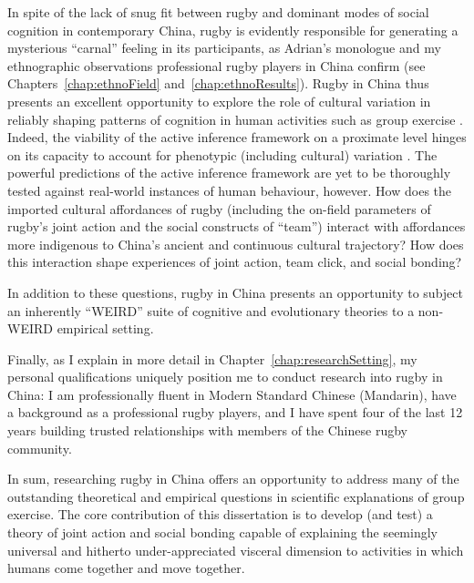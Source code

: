 \begin{CJK}{UTF8}{gbsn}
In spite of the lack of snug fit between rugby and dominant modes of social cognition in contemporary China, rugby is evidently responsible for generating a mysterious ``carnal'' feeling in its participants, as Adrian's monologue and my ethnographic observations professional rugby players in China confirm (see Chapters~\ref{chap:ethnoField} and~\ref{chap:ethnoResults}).  Rugby in China thus presents an excellent opportunity to explore the role of cultural variation in reliably shaping patterns of cognition in human activities such as group exercise \citep{Ramstead2016,Mesoudi2013}.  Indeed, the viability of the active inference framework on a proximate level hinges on its capacity to account for phenotypic (including cultural) variation \citep{Badcock2012}.  The powerful predictions of the active inference framework are yet to be thoroughly tested against real-world instances of human behaviour, however.  How does the imported cultural affordances of rugby (including the on-field parameters of rugby's joint action and the social constructs of ``team'') interact with affordances more indigenous to China's ancient and continuous cultural trajectory?  How does this interaction shape experiences of joint action, team click, and social bonding?

In addition to these questions, rugby in China presents an opportunity to subject an inherently ``WEIRD'' \citep[Western, Educated, Industrial, Rich, and Democratic; see][]{Henrich2010d} suite of cognitive and evolutionary theories to a non-WEIRD empirical setting.

Finally, as I explain in more detail in Chapter~\ref{chap:researchSetting}, my personal qualifications uniquely position me to conduct research into rugby in China: I am professionally fluent in Modern Standard Chinese (Mandarin), have a background as a professional rugby players, and I have spent four of the last 12 years building trusted relationships with members of the Chinese rugby community.


In sum, researching rugby in China offers an opportunity to address many of the outstanding theoretical and empirical questions in scientific explanations of group exercise.  The core contribution of this dissertation is to develop (and test) a theory of joint action and social bonding capable of explaining the seemingly universal and hitherto under-appreciated visceral dimension to activities in which humans come together and move together.








\end{CJK}
